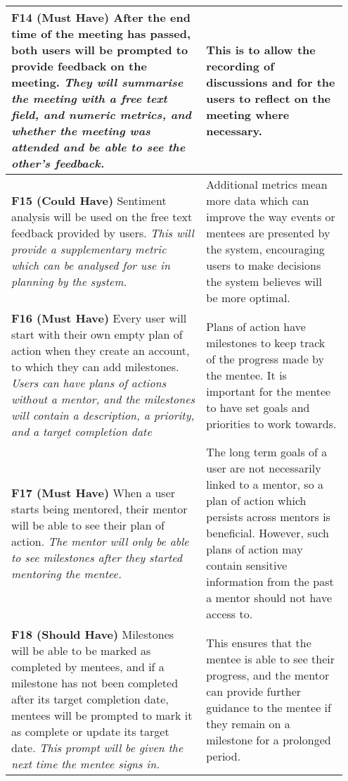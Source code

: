 \documentclass[10pt]{article}
\begin{document}
\begin{longtable}{|p{0.55\linewidth}|p{0.4\linewidth}|}
    \textbf{F14 (Must Have) }
    After the end time of the meeting has passed, both users will be prompted to
    provide feedback on the meeting.
    \textit{They will summarise the meeting with a free text field, and numeric
    metrics, and whether the meeting was attended and be able to see the other's
    feedback.}
        &
    This is to allow the recording of discussions and for the users to reflect
    on the meeting where necessary.
    \\ \hline

    \textbf{F15 (Could Have) }
    Sentiment analysis will be used on the free text feedback provided by users.
    \textit{This will provide a supplementary metric which can be analysed for
    use in planning by the system.}
        &
    Additional metrics mean more data which can improve the way events or
    mentees are presented by the system, encouraging users to make decisions the
    system believes will be more optimal.
    \\ \hline


    \textbf{F16 (Must Have) }
    Every user will start with their own empty plan of action when they create
    an account, to which they can add milestones.
    \textit{Users can have plans of actions without a mentor, and the milestones
    will contain a description, a priority, and a target completion date}
        &
    Plans of action have milestones to keep track of the progress made by the
    mentee. It is important for the mentee to have set goals and priorities to
    work towards.
    \\ \hline

    \textbf{F17 (Must Have) }
    When a user starts being mentored, their mentor will be able to see their
    plan of action.
    \textit{The mentor will only be able to see milestones after they started
    mentoring the mentee.}
        &
    The long term goals of a user are not necessarily linked to a mentor, so
    a plan of action which persists across mentors is beneficial. However, such
    plans of action may contain sensitive information from the past a mentor
    should not have access to.
    \\ \hline

    \textbf{F18 (Should Have) }
    Milestones will be able to be marked as completed by mentees, and if a
    milestone has not been completed after its target completion date, mentees
    will be prompted to mark it as complete or update its target date.
    \textit{This prompt will be given the next time the mentee signs in.}
        &
    This ensures that the mentee is able to see their progress, and the mentor
    can provide further guidance to the mentee if they remain on a milestone for
    a prolonged period.
    \\ \hline


\end{longtable}
\end{document}
